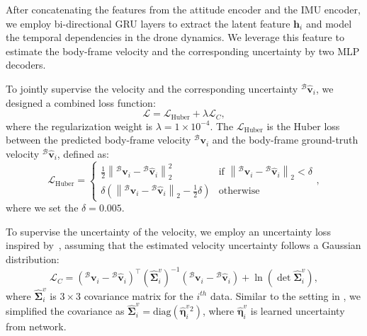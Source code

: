 After concatenating the features from the attitude encoder and the IMU encoder, we employ bi-directional GRU layers to extract the latent feature $\mathbf{h}_i$ and model the temporal dependencies in the drone dynamics. We leverage this feature to estimate the body-frame velocity and the corresponding uncertainty by two MLP decoders.

To jointly supervise the velocity and the corresponding uncertainty ${}^\mathcal{B}\hat{\mathbf{v}}_i$, we designed a combined loss function:
\begin{equation}
   \mathcal{L} = \mathcal{L}_{\text{Huber}} + \lambda \mathcal{L}_{C},
\end{equation}
where the regularization weight is $\lambda = 1\times 10^{-4}$. The $\mathcal{L}_{\text{Huber}}$ is the Huber loss between the predicted body-frame velocity ${}^\mathcal{B}\mathbf{v}_i$ and the body-frame ground-truth velocity ${}^\mathcal{B}\hat{\mathbf{v}}_i$, defined as:
\begin{equation}
    \mathcal{L}_{\text{Huber}} = \begin{cases}
        \tfrac{1}{2}\left\| {}^\mathcal{B}\mathbf{v}_i - {}^\mathcal{B}\hat{\mathbf{v}}_i \right\|_2^{2} & \text{if } \left\| {}^\mathcal{B}\mathbf{v}_i - {}^\mathcal{B}\hat{\mathbf{v}}_i \right\|_2 < \delta \\
        \delta \left( \left\| {}^\mathcal{B}\mathbf{v}_i - {}^\mathcal{B}\hat{\mathbf{v}}_i \right\|_2 - \tfrac{1}{2}\delta \right) & \text{otherwise}
    \end{cases} ,
\end{equation}
where we set the $\delta = 0.005$.

To supervise the uncertainty of the velocity, we employ an uncertainty loss inspired by~\cite{liu2020tlio}, assuming that the estimated velocity uncertainty follows a Gaussian distribution:
\begin{equation}
    \mathcal{L}_{C} = \left( {}^\mathcal{B}\mathbf{v}_i - {}^\mathcal{B}\hat{\mathbf{v}}_i \right)^{\top} \left(\hat{\boldsymbol{\Sigma}}^{v}_{i}\right)^{-1} \left( {}^\mathcal{B}\mathbf{v}_i - {}^\mathcal{B}\hat{\mathbf{v}}_i \right) + \ln \left( \det \hat{\boldsymbol{\Sigma}}^{v}_i \right),
\end{equation}
where $\hat{\boldsymbol{\Sigma}}^{v}_i$ is $3 \times 3$ covariance matrix for the $i^{th}$ data. Similar to the setting in \cite{liu2020tlio}, we simplified the covariance as  $\hat{\boldsymbol{\Sigma}}^{v}_i = \text{diag} (\hat{\boldsymbol{\eta}} ^{v}_i{}^2)$, where $\hat{\boldsymbol{\eta}} ^{v}_i$ is learned uncertainty from network.

